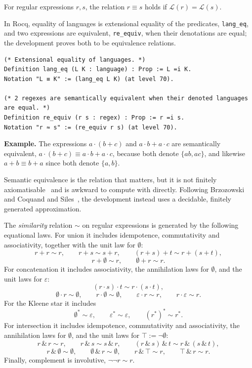 \begin{definition}\label{def:semantic-equivalence}
For regular expressions $r,s$, the relation $r \equiv s$ holds if
$\mathcal{L}(r)=\mathcal{L}(s)$.
\end{definition}

In Rocq, equality of languages is extensional equality of the predicates,
\texttt{lang\_eq}, and two expressions are equivalent, \texttt{re\_equiv}, when
their denotations are equal; the development proves both to be equivalence
relations.

\begin{lstlisting}[style=rocqstyle,caption={Language equality and semantic equivalence (\texttt{RegexSemantics.v}).},label={lst:equiv}]
(* Extensional equality of languages. *)
Definition lang_eq (L K : language) : Prop := L =i K.
Notation "L ≡ K" := (lang_eq L K) (at level 70).

(* 2 regexes are semantically equivalent when their denoted languages are equal. *)
Definition re_equiv (r s : regex) : Prop := r =i s.
Notation "r ≈ s" := (re_equiv r s) (at level 70).
\end{lstlisting}

\noindent\textbf{Example.} The expressions $a\cdot(b+c)$ and $a\cdot b+a\cdot c$ are
semantically equivalent, $a\cdot(b+c)\equiv a\cdot b+a\cdot c$, because both denote
$\{ab,ac\}$, and likewise $a+b\equiv b+a$ since both denote $\{a,b\}$.

\medskip
Semantic equivalence is the relation that matters, but it is not
finitely axiomatisable~\cite{Salomaa,Kozen} and is awkward to compute with
directly. Following Brzozowski~\cite{B64} and Coquand and
Siles~\cite{CoquandRegexEquality}, the development instead uses a decidable,
finitely generated approximation.

\begin{definition}\label{def:similarity}
The \emph{similarity} relation $\sim$ on regular expressions is generated by the
following equational laws. For union it includes idempotence, commutativity and
associativity, together with the unit law for $\emptyset$:
\[
  r+r \sim r, \qquad r+s \sim s+r, \qquad (r+s)+t \sim r+(s+t),
\]
\[
  r+\emptyset \sim r, \qquad \emptyset+r \sim r.
\]
For concatenation it includes associativity, the annihilation laws for $\emptyset$,
and the unit laws for $\varepsilon$:
\[
  (r\cdot s)\cdot t \sim r\cdot(s\cdot t),
\]
\[
  \emptyset\cdot r \sim \emptyset, \qquad r\cdot\emptyset \sim \emptyset, \qquad
  \varepsilon\cdot r \sim r, \qquad r\cdot\varepsilon \sim r.
\]
For the Kleene star it includes
\[
  \emptyset^* \sim \varepsilon, \qquad \varepsilon^* \sim \varepsilon, \qquad
  (r^*)^* \sim r^*.
\]
For intersection it includes idempotence, commutativity and associativity, the
annihilation laws for $\emptyset$, and the unit laws for $\top := \neg\emptyset$:
\[
  r\,\&\,r \sim r, \qquad r\,\&\,s \sim s\,\&\,r, \qquad
  (r\,\&\,s)\,\&\,t \sim r\,\&\,(s\,\&\,t),
\]
\[
  r\,\&\,\emptyset \sim \emptyset, \qquad \emptyset\,\&\,r \sim \emptyset, \qquad
  r\,\&\,\top \sim r, \qquad \top\,\&\,r \sim r.
\]
Finally, complement is involutive, $\neg\neg r \sim r$.
\end{definition}

